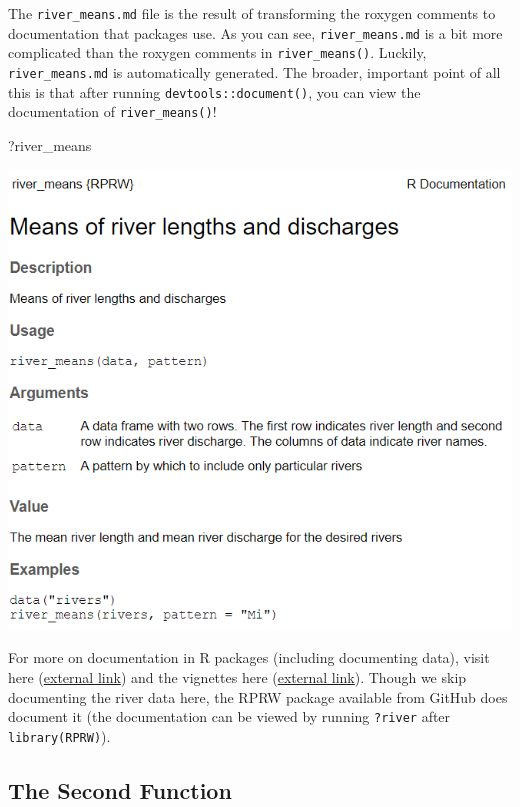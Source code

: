 \documentclass[
]{book}
\newenvironment{Shaded}{\begin{snugshade}}{\end{snugshade}}
\newcommand{\NormalTok}[1]{#1}
\begin{document}
The \texttt{river\_means.md} file is the result of transforming the roxygen comments to documentation that packages use. As you can see, \texttt{river\_means.md} is a bit more complicated than the roxygen comments in \texttt{river\_means()}. Luckily, \texttt{river\_means.md} is automatically generated. The broader, important point of all this is that after running \texttt{devtools::document()}, you can view the documentation of \texttt{river\_means()}!

\begin{Shaded}
\begin{Highlighting}[]
\NormalTok{?river_means}
\end{Highlighting}
\end{Shaded}

\includegraphics[width=1\linewidth]{images/newrpack_example}

For more on documentation in R packages (including documenting data), visit here (\href{https://r-pkgs.org/man.html\#man}{external link}) and the vignettes here (\href{https://cran.r-project.org/web/packages/roxygen2/index.html}{external link}). Though we skip documenting the river data here, the RPRW package available from GitHub does document it (the documentation can be viewed by running \texttt{?river} after \texttt{library(RPRW)}).

\hypertarget{second-function}{%
\subsection{The Second Function}\label{second-function}}
\end{document}
